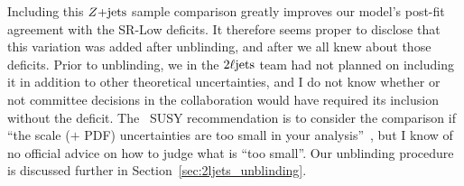 Including this $Z\mathrm{+jets}$ sample comparison greatly improves our model's post-fit
agreement with the SR-Low deficits.
It therefore seems proper to disclose that this variation was added after
unblinding, and after we all knew about those deficits.
Prior to unblinding, we in the $2\ell\mathrm{jets}$ team had not planned on including it
in addition to other theoretical uncertainties, and I do not know whether or
not committee decisions in the collaboration would have required its inclusion
without the deficit.
The \atlas\ SUSY recommendation is to consider the comparison if
``the scale ($+$ PDF) uncertainties are too small in your
analysis''~\cite{atlas_twiki_susytheoretical},
but I know of no official advice on how to judge what is ``too small''.
Our unblinding procedure is discussed further in
Section~\ref{sec:2ljets_unblinding}.

